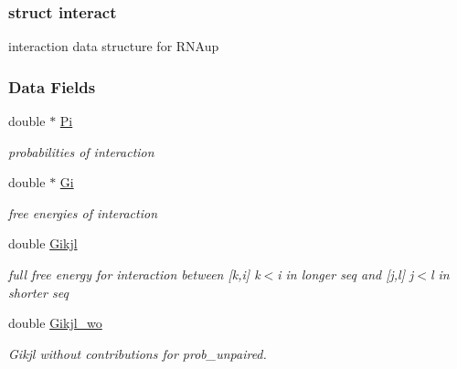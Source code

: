 \subsubsection{struct interact}
interaction data structure for R\+N\+Aup \subsubsection*{Data Fields}
\begin{DoxyCompactItemize}
\item 
\mbox{\label{group__data__structures_a1fc8b3860c083f164daa9712690a3a56}} 
double $\ast$ \mbox{\hyperlink{group__data__structures_a1fc8b3860c083f164daa9712690a3a56}{Pi}}
\begin{DoxyCompactList}\small\item\em probabilities of interaction \end{DoxyCompactList}\item 
\mbox{\label{group__data__structures_a54f8183542fff4c32ab7ace49a16c02c}} 
double $\ast$ \mbox{\hyperlink{group__data__structures_a54f8183542fff4c32ab7ace49a16c02c}{Gi}}
\begin{DoxyCompactList}\small\item\em free energies of interaction \end{DoxyCompactList}\item 
\mbox{\label{group__data__structures_ad58303190f9e085c3ab59890cbf61223}} 
double \mbox{\hyperlink{group__data__structures_ad58303190f9e085c3ab59890cbf61223}{Gikjl}}
\begin{DoxyCompactList}\small\item\em full free energy for interaction between \mbox{[}k,i\mbox{]} k$<$i in longer seq and \mbox{[}j,l\mbox{]} j$<$l in shorter seq \end{DoxyCompactList}\item 
\mbox{\label{group__data__structures_a41793812abae560805414761fec398fe}} 
double \mbox{\hyperlink{group__data__structures_a41793812abae560805414761fec398fe}{Gikjl\+\_\+wo}}
\begin{DoxyCompactList}\small\item\em Gikjl without contributions for prob\+\_\+unpaired. \end{DoxyCompactList}\item 

\end{DoxyCompactItemize}
